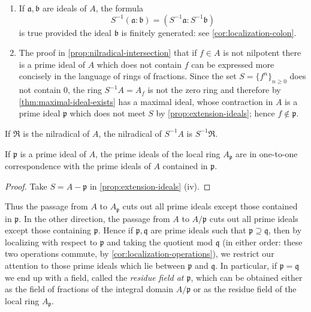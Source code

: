 \begin{remark}
\begin{enumerate}[1)]
    \item If $\mathfrak{a}, \mathfrak{b}$ are ideals of $A$, the formula
    \[
        S^{-1}(\mathfrak{a} : \mathfrak{b}) = (S^{-1}\mathfrak{a} : S^{-1}\mathfrak{b})
    \]
    is true provided the ideal $\mathfrak{b}$ is finitely generated: see \eqref{cor:localization-colon}.

    \item The proof in \eqref{prop:nilradical-intersection} that if $f \in A$ is not nilpotent there is a prime ideal of $A$ which does not contain $f$ can be expressed more concisely in the language of rings of fractions. Since the set $S = \{f^n\}_{n \geq 0}$ does not contain $0$, the ring $S^{-1}A = A_f$ is not the zero ring and therefore by \eqref{thm:maximal-ideal-exists} has a maximal ideal, whose contraction in $A$ is a prime ideal $\mathfrak{p}$ which does not meet $S$ by \eqref{prop:extension-ideals}; hence $f \notin \mathfrak{p}$.
\end{enumerate}
\end{remark}

\begin{corollary}\label{cor:localization-nilradical}
If $\mathfrak{R}$ is the nilradical of $A$, the nilradical of $S^{-1}A$ is $S^{-1}\mathfrak{R}$.
\end{corollary}

\begin{corollary}\label{cor:spec-localization}
If $\mathfrak{p}$ is a prime ideal of $A$, the prime ideals of the local ring $A_{\mathfrak{p}}$ are in one-to-one correspondence with the prime ideals of $A$ contained in $\mathfrak{p}$.
\end{corollary}

\begin{proof}
Take $S = A - \mathfrak{p}$ in \eqref{prop:extension-ideals} (iv).
\end{proof}

\begin{remark}
Thus the passage from $A$ to $A_{\mathfrak{p}}$ cuts out all prime ideals except those contained in $\mathfrak{p}$. In the other direction, the passage from $A$ to $A/\mathfrak{p}$ cuts out all prime ideals except those containing $\mathfrak{p}$. Hence if $\mathfrak{p}, \mathfrak{q}$ are prime ideals such that $\mathfrak{p} \supseteq \mathfrak{q}$, then by localizing with respect to $\mathfrak{p}$ and taking the quotient mod $\mathfrak{q}$ (in either order: these two operations commute, by \eqref{cor:localization-operations}), we restrict our attention to those prime ideals which lie between $\mathfrak{p}$ and $\mathfrak{q}$. In particular, if $\mathfrak{p} = \mathfrak{q}$ we end up with a field, called the \emph{residue field at $\mathfrak{p}$}, which can be obtained either as the field of fractions of the integral domain $A/\mathfrak{p}$ or as the residue field of the local ring $A_{\mathfrak{p}}$.
\end{remark}

